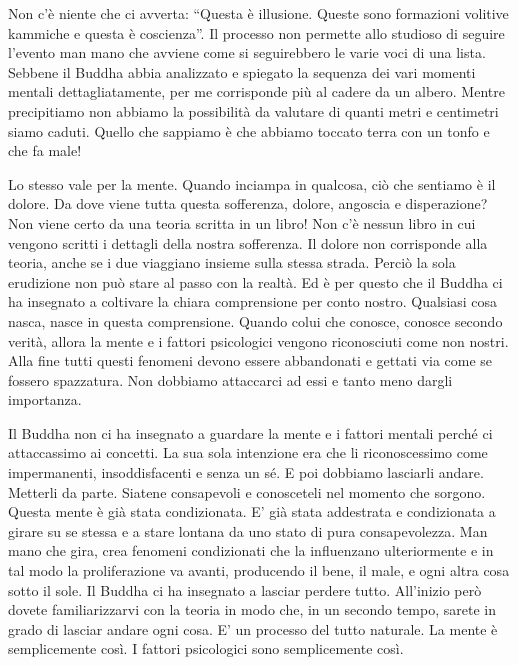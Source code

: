 Non c'è niente che ci avverta: ``Questa è illusione. Queste sono
formazioni volitive kammiche e questa è coscienza''. Il processo non
permette allo studioso di seguire l'evento man mano che avviene come si
seguirebbero le varie voci di una lista. Sebbene il Buddha abbia
analizzato e spiegato la sequenza dei vari momenti mentali
dettagliatamente, per me corrisponde più al cadere da un albero. Mentre
precipitiamo non abbiamo la possibilità da valutare di quanti metri e
centimetri siamo caduti. Quello che sappiamo è che abbiamo toccato terra
con un tonfo e che fa male!

Lo stesso vale per la mente. Quando inciampa in qualcosa, ciò che
sentiamo è il dolore. Da dove viene tutta questa sofferenza, dolore,
angoscia e disperazione? Non viene certo da una teoria scritta in un
libro! Non c'è nessun libro in cui vengono scritti i dettagli della
nostra sofferenza. Il dolore non corrisponde alla teoria, anche se i due
viaggiano insieme sulla stessa strada. Perciò la sola erudizione non può
stare al passo con la realtà. Ed è per questo che il Buddha ci ha
insegnato a coltivare la chiara comprensione per conto nostro. Qualsiasi
cosa nasca, nasce in questa comprensione. Quando colui che conosce,
conosce secondo verità, allora la mente e i fattori psicologici vengono
riconosciuti come non nostri. Alla fine tutti questi fenomeni devono
essere abbandonati e gettati via come se fossero spazzatura. Non
dobbiamo attaccarci ad essi e tanto meno dargli importanza.

\clearpage


Il Buddha non ci ha insegnato a guardare la mente e i fattori mentali
perché ci attaccassimo ai concetti. La sua sola intenzione era che li
riconoscessimo come impermanenti, insoddisfacenti e senza un sé. E poi
dobbiamo lasciarli andare. Metterli da parte. Siatene consapevoli e
conosceteli nel momento che sorgono. Questa mente è già stata
condizionata. E' già stata addestrata e condizionata a girare su se
stessa e a stare lontana da uno stato di pura consapevolezza. Man mano
che gira, crea fenomeni condizionati che la influenzano ulteriormente e
in tal modo la proliferazione va avanti, producendo il bene, il male, e
ogni altra cosa sotto il sole. Il Buddha ci ha insegnato a lasciar
perdere tutto. All'inizio però dovete familiarizzarvi con la teoria in
modo che, in un secondo tempo, sarete in grado di lasciar andare ogni
cosa. E' un processo del tutto naturale. La mente è semplicemente così.
I fattori psicologici sono semplicemente così.


